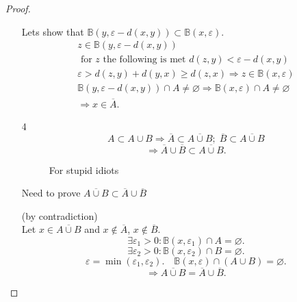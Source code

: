 \begin{proof}
\begin{itemize}
        Lets show that $\mathbb{B}(y, \varepsilon - d(x, y)) \subset \mathbb{B}(x, \varepsilon)$.
        \begin{gather*}
            z \in \mathbb{B}(y, \varepsilon - d(x, y)) \\
            \text{ for $z$ the following is met } d(z, y) < \varepsilon - d(x, y) \\
            \varepsilon > d(z, y) + d(y, x) \geq d(z, x) \Rightarrow
            z \in \mathbb{B}(x, \varepsilon) \\ 
            \mathbb{B}(y, \varepsilon - d(x, y)) \cap A \not= \varnothing \Rightarrow 
            \mathbb{B}(x, \varepsilon) \cap A \not= \varnothing \\
            \Rightarrow x \in \overline{A}.
        \end{gather*}

    \item[4] \[
    A \subset A \cup B \Rightarrow \overline{A} \subset \overline{A \cup B}; \; \overline{B} \subset \overline{A \cup B}
    \] 
    \[
    \Rightarrow \overline{A} \cup \overline{B} \subset \overline{A \cup B}
    .\] 
\begin{figure}[ht]
    \centering
    \caption{For stupid idiots}
    \label{fig:for-stupid-idiots}
\end{figure}

    Need to prove $\overline{A \cup B} \subset \overline{A} \cup \overline{B}$

    (by contradiction) \\
    Let $x \in \overline{A \cup B}$ and $x \not\in \overline{A}$, $x \not\in \overline{B}$.
    \[
    \exists \varepsilon_1 > 0 : \mathbb{B}\left( x, \varepsilon_1 \right) \cap A = \varnothing
    .\] 
    \[
    \exists \varepsilon_2 > 0 : \mathbb{B}\left( x, \varepsilon_2 \right) \cap B = \varnothing
    .\] 
    \[
    \varepsilon = \min(\varepsilon_1, \varepsilon_2). \quad
    \mathbb{B}(x, \varepsilon) \cap \left( A \cup B \right) = \varnothing
    .\] 
    \[
    \Rightarrow \overline{A \cup B} = \overline{A} \cup \overline{B}
    .\] 
    \end{itemize}
\end{proof}


